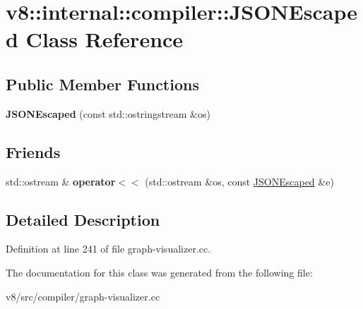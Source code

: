 \hypertarget{classv8_1_1internal_1_1compiler_1_1JSONEscaped}{}\section{v8\+:\+:internal\+:\+:compiler\+:\+:J\+S\+O\+N\+Escaped Class Reference}
\label{classv8_1_1internal_1_1compiler_1_1JSONEscaped}
\subsection*{Public Member Functions}
\begin{DoxyCompactItemize}
\item 
\mbox{\label{classv8_1_1internal_1_1compiler_1_1JSONEscaped_a587523f5f9f906511d1a61cd593d36cc}} 
{\bfseries J\+S\+O\+N\+Escaped} (const std\+::ostringstream \&os)
\end{DoxyCompactItemize}
\subsection*{Friends}
\begin{DoxyCompactItemize}
\item 
\mbox{\label{classv8_1_1internal_1_1compiler_1_1JSONEscaped_ad54be34aa097348c9bffaca55448e67c}} 
std\+::ostream \& {\bfseries operator$<$$<$} (std\+::ostream \&os, const \mbox{\hyperlink{classv8_1_1internal_1_1compiler_1_1JSONEscaped}{J\+S\+O\+N\+Escaped}} \&e)
\end{DoxyCompactItemize}


\subsection{Detailed Description}


Definition at line 241 of file graph-\/visualizer.\+cc.



The documentation for this class was generated from the following file\+:\begin{DoxyCompactItemize}
\item 
v8/src/compiler/graph-\/visualizer.\+cc\end{DoxyCompactItemize}
